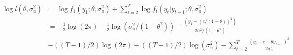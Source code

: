 \documentclass[a4paper]{scrartcl}
\begin{document}
\begin{enumerate}
\begin{enumerate}
\begin{solution}
                            \begin{align*}
                                \log l(\theta,\sigma_u^2) & = \log f_1(y_1;\theta,\sigma_u^2)+  \sum_{t=2}^{T}\log f_t(y_t|y_{t-1};\theta,\sigma_u^2)                                \\
                                                          & = -\frac{1}{2}\log(2\pi) -\frac{1}{2}\log(\sigma_u^2/(1-\theta^2))-\frac{(y_1-(c/(1-\theta))^2)}{2\sigma^2/(1-\theta^2)} \\
                                                          & -((T-1)/2)\log(2\pi)-((T-1)/2)\log(\sigma^2_u)-\sum_{t=2}^{T}\frac{(y_t-c-\theta y_{t-1})^2}{2\sigma_u^2}
                            \end{align*}
                        \end{solution}
                        

\end{enumerate}
\end{enumerate}
\end{document}
